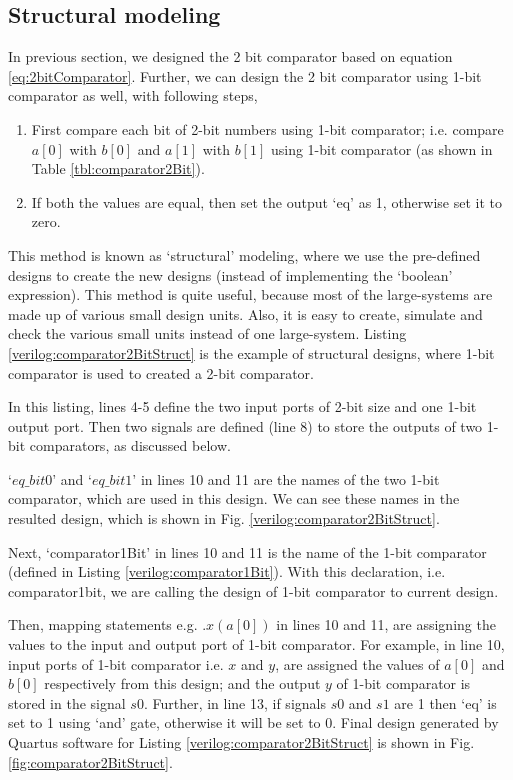 \subsection{Structural modeling}\label{sec:structureModeling}
In previous section, we designed the 2 bit comparator based on equation \ref{eq:2bitComparator}. Further, we can design the 2 bit comparator using 1-bit comparator as well, with following steps, 
\begin{enumerate}
	\item First compare each bit of 2-bit numbers using 1-bit comparator;  i.e. compare $a[0]$ with $b[0]$ and $a[1]$ with $b[1]$ using 1-bit comparator (as shown in Table \ref{tbl:comparator2Bit}). 
	
	\item If both the values are equal, then set the output `eq' as 1, otherwise set it to zero. 
\end{enumerate}

This method is known as `structural' modeling, where we use the pre-defined designs to create the new designs (instead of implementing the `boolean' expression). This method is quite useful, because most of the large-systems are made up of various small design units. Also, it is easy to create, simulate and check the various small units instead of one large-system. Listing \ref {verilog:comparator2BitStruct} is the example of structural designs, where 1-bit comparator is used to created a 2-bit comparator.  

\begin{explanation}
	In this listing, lines 4-5 define the two input ports of 2-bit size and one 1-bit output port. Then two signals are defined (line 8) to store the outputs of two 1-bit comparators, as discussed below.
	
	`$eq\_bit0$' and `$eq\_bit1$' in lines 10 and 11 are the names of the two 1-bit comparator, which are used in this design. We can see these names in the resulted design, which is shown in Fig. \ref{verilog:comparator2BitStruct}.  
	
	Next, `comparator1Bit' in lines 10 and 11 is the name of the 1-bit comparator (defined in Listing \ref{verilog:comparator1Bit}). With this declaration, i.e. comparator1bit, we are calling the design of 1-bit comparator to current design. 
	
	Then, mapping statements e.g. $.x(a[0])$ in lines 10 and 11, are assigning the values to the input and output port of 1-bit comparator. For example, in line 10, input ports of 1-bit comparator i.e. $x$ and $y$, are assigned the values of $a[0]$ and $b[0]$ respectively from this design; and the output $y$ of 1-bit comparator is stored in the signal $s0$. Further, in line 13, if signals $s0$ and $s1$ are 1 then `eq' is set to 1 using `and' gate, otherwise it will be set to 0. Final design generated by Quartus software for Listing \ref{verilog:comparator2BitStruct} is shown in Fig. \ref{fig:comparator2BitStruct}. 
\end{explanation}

